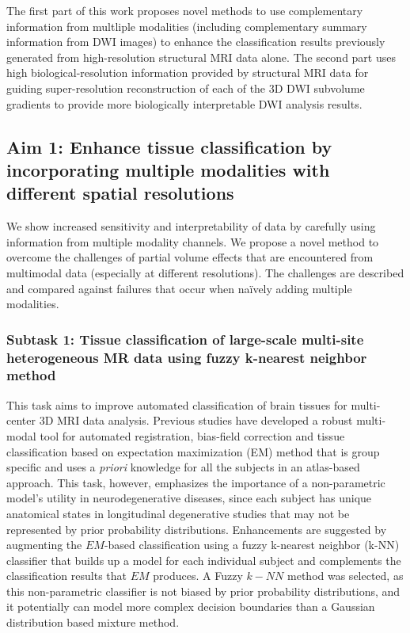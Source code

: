 The first part of this work proposes novel methods to use complementary information from multliple modalities (including complementary summary information from DWI images) to enhance the classification results previously generated from high-resolution structural MRI data alone. The second part uses high biological-resolution information provided by structural MRI data for guiding super-resolution reconstruction of each of the 3D DWI subvolume gradients to provide more biologically interpretable DWI analysis results.

\subsection{Aim 1: Enhance tissue classification by incorporating multiple modalities with different spatial resolutions}

We show increased sensitivity and interpretability of data by carefully using information from multiple modality channels.  We propose a novel method to overcome the challenges of partial volume effects that are encountered from multimodal data (especially at different resolutions).  The challenges are described and compared against failures that occur when na\"{i}vely adding multiple modalities.%

\subsubsection{Subtask 1: Tissue classification of large-scale multi-site heterogeneous MR data using fuzzy k-nearest neighbor method}

This task aims to improve automated classification of brain tissues for multi-center 3D MRI data analysis. 
Previous studies have developed a robust multi-modal tool for automated registration, bias-field correction and tissue classification based on expectation maximization (EM) method \cite{Kim2013} that is group specific and uses a \emph{priori} knowledge for all the subjects in an atlas-based approach.
This task, however, emphasizes the importance of a non-parametric model's utility in neurodegenerative diseases, since each subject has unique anatomical states in longitudinal degenerative studies that may not be represented by prior probability distributions. Enhancements are suggested by augmenting the $EM$-based classification using a fuzzy k-nearest neighbor (k-NN) classifier that builds up a model for each individual subject and complements the classification results that $EM$ produces.
A Fuzzy $k-NN$ method was selected, as this non-parametric classifier is not biased by prior probability distributions, and it potentially can model more complex decision boundaries than a Gaussian distribution based mixture method.

